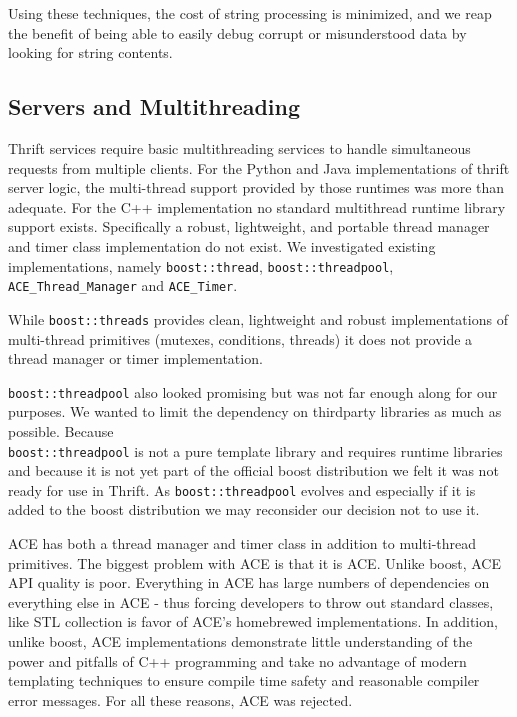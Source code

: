 \documentclass[nocopyrightspace,blockstyle]{sigplanconf}
\begin{document}
Using these techniques, the cost of string processing is minimized, and we
reap the benefit of being able to easily debug corrupt or misunderstood data by
looking for string contents.

\subsection{Servers and Multithreading}
Thrift services require basic multithreading services to handle simultaneous
requests from multiple clients. For the Python and Java implementations of
thrift server logic, the multi-thread support provided by those runtimes was
more than adequate. For the C++ implementation no standard multithread runtime
library support exists. Specifically a robust, lightweight, and portable 
thread manager and timer class implementation do not exist. We investigated
existing implementations, namely \texttt{boost::thread}, 
\texttt{boost::threadpool}, \texttt{ACE\_Thread\_Manager} and
\texttt{ACE\_Timer}.  

While \texttt{boost::threads}\cite{boost.threads}  provides clean,
lightweight and robust implementations of multi-thread primitives (mutexes,
conditions, threads) it does not provide a thread manager or timer
implementation.  

\texttt{boost::threadpool}\cite{boost.threadpool} also looked promising but
was not far enough along for our purposes. We wanted to limit the dependency on
thirdparty libraries as much as possible. Because\\
\texttt{boost::threadpool} is
not a pure template library and requires runtime libraries and because it is
not yet part of the official boost distribution we felt it was not ready for
use in Thrift. As \texttt{boost::threadpool} evolves and especially if it is
added to the boost distribution we may reconsider our decision not to use it.

ACE has both a thread manager and timer class in addition to multi-thread
primitives. The biggest problem with ACE is that it is ACE. Unlike boost, ACE
API quality is poor. Everything in ACE has large numbers of dependencies on
everything else in ACE - thus forcing developers to throw out standard 
classes, like STL collection is favor of ACE's homebrewed implementations. In
addition, unlike boost, ACE implementations demonstrate little understanding
of the power and pitfalls of C++ programming and take no advantage of modern
templating techniques to ensure compile time safety and reasonable compiler
error messages. For all these reasons, ACE was rejected.
\end{document}
